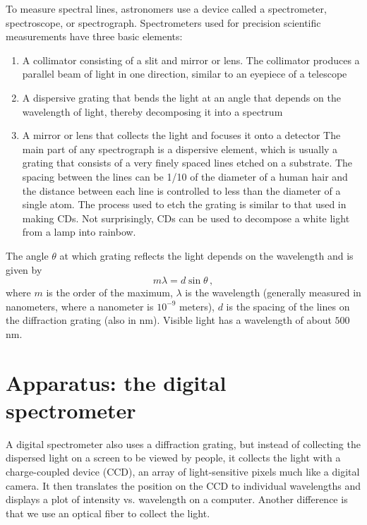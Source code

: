 To measure spectral lines, astronomers use a device called a spectrometer, spectroscope, or spectrograph. Spectrometers used for precision scientific measurements have three basic elements:
\begin{enumerate}
	\item A collimator consisting of a slit and mirror or lens. The collimator produces a
parallel beam of light in one direction, similar to an eyepiece of a telescope

	\item A dispersive grating that bends the light at an angle that depends on the
wavelength of light, thereby decomposing it into a spectrum

	\item A mirror or lens that collects the light and focuses it onto a detector
The main part of any spectrograph is a dispersive element, which is usually a grating that
consists of a very finely spaced lines etched on a substrate. The spacing between the
lines can be 1/10 of the diameter of a human hair and the distance between each line is
controlled to less than the diameter of a single atom. The process used to etch the grating
is similar to that used in making CDs. Not surprisingly, CDs can be used to decompose a
white light from a lamp into rainbow.%
\end{enumerate}

The angle $\theta$ at which grating reflects the light depends on the wavelength and is given by
\begin{equation}
 m \lambda = d \sin{\theta}\,,
\end{equation}
where $m$ is the order of the maximum, $\lambda$ is the wavelength (generally measured in nanometers, where a nanometer is $10^{-9}$ meters), $d$ is the spacing of the lines on the diffraction grating (also in nm). Visible light has a wavelength of about $500\:$nm.

\section{Apparatus: the digital spectrometer}

A digital spectrometer also uses a diffraction grating, but instead of collecting the dispersed light on a screen to be viewed by people, it collects the light with a charge-coupled device (CCD), an array of light-sensitive pixels much like a digital camera. It then translates the position on the CCD to individual wavelengths and displays a plot of intensity vs. wavelength on a computer. %
Another difference is that we use an optical fiber to collect the light.


